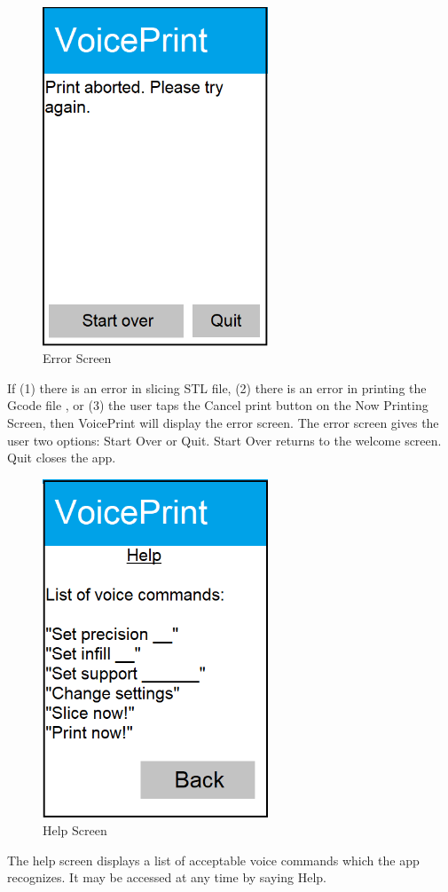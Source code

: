 \begin{figure}[h!]
	\centering
   	\includegraphics[width=0.60\textwidth]{images/Activity7.png}
   	\caption{Error Screen}
\end{figure}

If (1) there is an error in slicing STL file, (2) there is an error in printing the Gcode file , or (3) the user taps the Cancel print button on the Now Printing Screen, then VoicePrint will display the error screen. The error screen gives the user two options: Start Over or Quit. Start Over returns to the welcome screen. Quit closes the app.

\newpage

\begin{figure}[h!]
	\centering
   	\includegraphics[width=0.60\textwidth]{images/ActivityHelp.png}
   	\caption{Help Screen}
\end{figure}

The help screen displays a list of acceptable voice commands which the app recognizes. It may be accessed at any time by saying Help.

